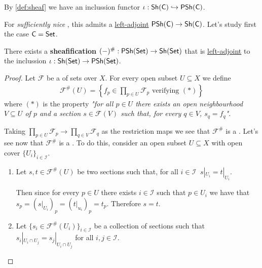 \documentclass[../main.tex]{subfiles}
\begin{document}
By \autoref{def:sheaf} we have an inclussion functor \(\iota: \mathsf{Sh}(\mathsf{C}) \hookrightarrow \mathsf{PSh}(\mathsf{C})\).

For \textit{sufficiently nice} , this  admits a \hyperref[def:adjoint]{left-adjoint} \(\mathsf{PSh}(\mathsf{C}) \to \mathsf{Sh}(\mathsf{C})\).
Let's study first the case \(\mathsf{C} = \mathsf{Set}\).

\begin{theorem}[Sheafification] \label{thm:sheafification-set}
  There exists a \textbf{sheafification}  \((-)^{\#}: \mathsf{PSh}(\mathsf{Set}) \to \mathsf{Sh}(\mathsf{Set})\) that is \hyperref[def:adjunction]{left-adjoint} to the inclussion  \(\iota: \mathsf{Sh}(\mathsf{Set}) \to \mathsf{PSh}(\mathsf{Set})\).
\end{theorem}
\begin{proof}
  Let \(\mathcal{F}\) be a  of sets over \(X\).
  For every open subset \(U \subseteq X\) we define
  \begin{align*}
    \mathcal{F}^{\#}(U) = \left\{ f_{p} \in \prod_{p \in U} \mathcal{F}_{p} \text{ verifying } (\ast) \right\}
  \end{align*}
  where \((\ast)\) is the property \textit{"for all \(p \in U\) there exists an open neighbourhood \(V \subseteq U\) of \(p\) and a section \(s \in \mathcal{F}(V)\) such that, for every \(q \in V\), \(s_{q} = f_{q}\)"}.

  Taking \(\prod_{p \in U} \mathcal{F}_{p} \to \prod_{q \in V} \mathcal{F}_{q}\) as the restriction maps we see that \(\mathcal{F}^{\#}\) is a .
  Let's see now that \(\mathcal{F}^{\#}\) is a . To do this, consider an open subset \(U \subseteq X\) with open cover \(\{U_{i}\}_{i \in \mathcal{I}}\).
  \begin{enumerate}
    \item[\ref{axiom:sheaf-identity}] Let \(s, t \in \mathcal{F}^{\#}(U)\) be two sections such that, for all \(i \in \mathcal{I} \;\; s|_{U_{i}} = t|_{U_{i}}\).

          Then since for every \(p \in U\) there exists \(i \in \mathcal{I}\) such that \(p \in U_{i}\) we have that \(s_{p} = (s|_{U_{i}})_{p} = (t|_{u_{i}})_{p} = t_{p}\).
          Therefore \(s = t\).
    \item[\ref{axiom:sheaf-gluability}] Let \(\{s_{i} \in \mathcal{F}^{\#}(U_{i})\}_{i \in \mathcal{I}}\) be a collection of sections such that \(s_{i}|_{U_{i} \cap U_{j}} = s_{j}|_{U_{i} \cap U_{j}}\) for all \(i, j \in \mathcal{I}\).


\end{enumerate}
\end{proof}
\end{document}
